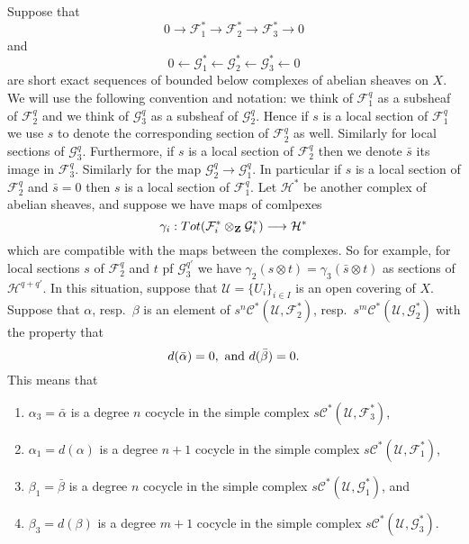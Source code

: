 \medskip\noindent
Suppose that
$$
0 
\to
{\mathcal F}_1^*
\to 
{\mathcal F}_2^*
\to 
{\mathcal F}_3^*
\to 
0
$$
and
$$
0 
\leftarrow
{\mathcal G}_1^*
\leftarrow
{\mathcal G}_2^*
\leftarrow
{\mathcal G}_3^*
\leftarrow
0
$$
are short exact sequences of bounded below complexes of abelian
sheaves on $X$. We will use the following convention and notation: we think of
${\mathcal F}_1^q$ as a subsheaf of ${\mathcal F}_2^q$ and we think of
${\mathcal G}_3^q$ as a subsheaf of ${\mathcal G}_2^q$. Hence if $s$ is
a local section of ${\mathcal F}_1^q$ we use $s$ to denote 
the corresponding section of ${\mathcal F}_2^q$ as well. Similarly 
for local sections of ${\mathcal G}_3^q$. Furthermore,
if $s$ is a local section of ${\mathcal F}_2^q$ then we denote
$\bar s$ its image in ${\mathcal F}_3^q$. Similarly for the
map ${\mathcal G}_2^q \to {\mathcal G}^q_1$. In particular if
$s$ is a local section of ${\mathcal F}_2^q$ and $\bar s = 0$
then $s$ is a local section of ${\mathcal F}_1^q$. Let ${\mathcal H}^*$
be another complex of abelian sheaves, and suppose
we have maps of comlpexes
$$
\gamma_i :
Tot({\mathcal F}_i^* \otimes_{\bf Z} {\mathcal G}_i^*)
\longrightarrow
{\mathcal H}^*
$$
which are compatible with the maps between the complexes. So for
example, for local sections $s$ of ${\mathcal F}_2^q$ and
$t$ pf ${\mathcal G}_3^{q'}$ we have $\gamma_2(s\otimes t)
= \gamma_3(\bar s \otimes t)$ as sections of ${\mathcal H}^{q+q'}$.
In this situation, suppose that ${\mathcal U} = \{ U_i \}_{i\in I}$
is an open covering of $X$. Suppose that $\alpha$, resp.\ 
$\beta$ is an element of $s^n{\mathcal C}^*({\mathcal U}, {\mathcal F}_2^*)$,
resp.\ $s^m{\mathcal C}^*({\mathcal U}, {\mathcal G}_2^*)$ with the
property that 
$$
d(\bar \alpha) = 0,\ \hbox{and}\ d(\bar \beta)=0.
$$
This means that
\begin{enumerate}
\item $\alpha_3 = \bar \alpha$ is a degree $n$ cocycle
in the simple complex $s{\mathcal C}^*({\mathcal U}, {\mathcal F}_3^*)$,
\item $\alpha_1 = d(\alpha)$ is a degree $n+1$ 
cocycle in the simple complex
$s{\mathcal C}^*({\mathcal U}, {\mathcal F}_1^*)$,
\item $\beta_1 = \bar \beta$ is a degree $n$ cocycle
in the simple complex
$s{\mathcal C}^*({\mathcal U}, {\mathcal G}_1^*)$, and
\item $\beta_3 = d(\beta)$ is a degree $m+1$ 
cocycle in the simple complex
$s{\mathcal C}^*({\mathcal U}, {\mathcal G}_3^*)$.
\end{enumerate}

